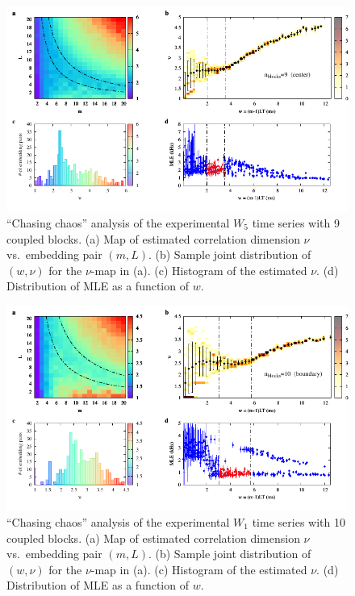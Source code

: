\begin{appendices}
\begin{figure}[!htbp]
    \centering
    \includegraphics[width=\linewidth]{../blocks/9_blocks/middle/2e5_points/plots/chaos_low.pdf}
    \caption{``Chasing chaos'' analysis of the experimental $W_5$ time series with 9 coupled blocks.
    (a) Map of estimated correlation dimension $\nu$ vs.\ embedding pair $(m, L)$.
    (b) Sample joint distribution of $(w,\nu)$ for the $\nu$-map in (a).
    (c) Histogram of the estimated $\nu$. (d) Distribution of MLE as a function of $w$.
    } 
\end{figure}

\begin{figure}[!htbp]
    \centering
    \includegraphics[width=\linewidth]{../blocks/10_blocks/2e5_points/plots/chaos_low.pdf}
    \caption{``Chasing chaos'' analysis of the experimental $W_1$ time series with 10 coupled blocks.
    (a) Map of estimated correlation dimension $\nu$ vs.\ embedding pair $(m, L)$.
    (b) Sample joint distribution of $(w,\nu)$ for the $\nu$-map in (a).
    (c) Histogram of the estimated $\nu$. (d) Distribution of MLE as a function of $w$.
    } 
\end{figure}


\end{appendices}
